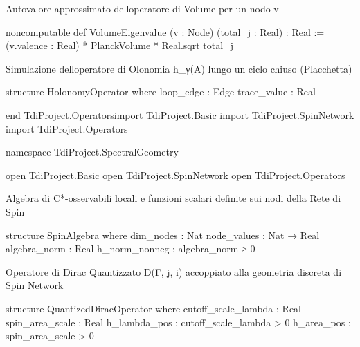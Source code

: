 \documentclass{article}
\newenvironment{Shaded}{%
  \begin{snugshade}%
}{%
  \end{snugshade}%
}%
\newenvironment{Highlighting}{%
}{%
}%
\newcommand{\NormalTok}[1]{#1}
\begin{document}
Autovalore approssimato dell\textquotesingle operatore di Volume per un
nodo v

\begin{Shaded}
\begin{Highlighting}[]
\NormalTok{noncomputable def VolumeEigenvalue (v : Node) (total\_j : Real) : Real :=}
\NormalTok{  (v.valence : Real) * PlanckVolume * Real.sqrt total\_j}

\end{Highlighting}
\end{Shaded}

Simulazione dell\textquotesingle operatore di Olonomia h\_γ(A) lungo un
ciclo chiuso (Placchetta)

\begin{Shaded}
\begin{Highlighting}[]
\NormalTok{structure HolonomyOperator where}
\NormalTok{  loop\_edge : Edge}
\NormalTok{  trace\_value : Real}

\NormalTok{end TdiProject.Operatorsimport TdiProject.Basic}
\NormalTok{import TdiProject.SpinNetwork}
\NormalTok{import TdiProject.Operators}

\NormalTok{namespace TdiProject.SpectralGeometry}

\NormalTok{open TdiProject.Basic}
\NormalTok{open TdiProject.SpinNetwork}
\NormalTok{open TdiProject.Operators}

\end{Highlighting}
\end{Shaded}

Algebra di C*-osservabili locali e funzioni scalari definite sui nodi
della Rete di Spin

\begin{Shaded}
\begin{Highlighting}[]
\NormalTok{structure SpinAlgebra where}
\NormalTok{  dim\_nodes : Nat}
\NormalTok{  node\_values : Nat → Real}
\NormalTok{  algebra\_norm : Real}
\NormalTok{  h\_norm\_nonneg : algebra\_norm ≥ 0}

\end{Highlighting}
\end{Shaded}

Operatore di Dirac Quantizzato D(Γ, j, i) accoppiato alla geometria
discreta di Spin Network

\begin{Shaded}
\begin{Highlighting}[]
\NormalTok{structure QuantizedDiracOperator where}
\NormalTok{  cutoff\_scale\_lambda : Real}
\NormalTok{  spin\_area\_scale : Real}
\NormalTok{  h\_lambda\_pos : cutoff\_scale\_lambda \textgreater{} 0}
\NormalTok{  h\_area\_pos : spin\_area\_scale \textgreater{} 0}

\end{Highlighting}
\end{Shaded}
\end{document}
